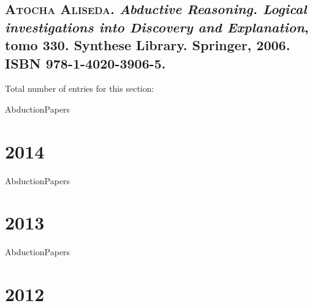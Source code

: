 \subsection*{\textsc{Atocha Aliseda}.
\newblock \emph{{Abductive Reasoning. Logical investigations into Discovery and
  Explanation}}, tomo 330.
\newblock Synthese Library. Springer, 2006.
\newblock ISBN 978-1-4020-3906-5.
}

Total number of entries for this section: 

\restartNumb

\begin{btUnit}
 \begin{btSect}{AbductionPapers}
  \section*{2014}
  \nocite{Magnani:UnderstandingAbduction}
  \nocite{Woods:AgainstFictionalism}
  \btPrintCited
 \end{btSect}
\end{btUnit}

\keepNumb

\begin{btUnit}
 \begin{btSect}{AbductionPapers}
  \section*{2013}
  \nocite{CordonDitmarschNepomuceno:DynamicConsequence}
  \nocite{Magnani:AbductionIgnorancePreserving}
  \nocite{PauwelsMeyerCampenhout:DesignThinkingSupport}
  \btPrintCited
 \end{btSect}
\end{btUnit}

\begin{btUnit}
 \begin{btSect}{AbductionPapers}
   \section*{2012}
    \nocite{NepomucenoSolerVelazquez:DinamicaInformacionAgentes}
    \nocite{Woods:CognitiveEconomicsAbduction}
    \btPrintCited
  \end{btSect}   
 \end{btUnit}

